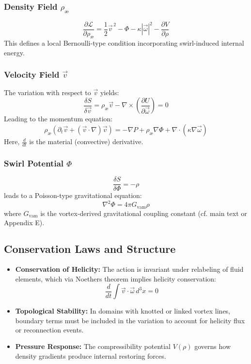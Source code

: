 \subsubsection*{Density Field $\rho_\text{\ae}$}
\begin{equation}
    \frac{\partial \mathcal{L}}{\partial \rho_\text{\ae}} = \frac{1}{2} \vec{v}^{\,2} - \Phi - \kappa |\vec{\omega}|^2 - \frac{\partial V}{\partial \rho}
\end{equation}
This defines a local Bernoulli-type condition incorporating swirl-induced internal energy.

\subsubsection*{Velocity Field $\vec{v}$}
The variation with respect to $\vec{v}$ yields:
\begin{equation}
    \frac{\delta S}{\delta \vec{v}} = \rho_\text{\ae}\vec{v} - \nabla \times \left( \frac{\partial U}{\partial \vec{\omega}} \right) = 0
\end{equation}
Leading to the momentum equation:
\begin{equation}
    \rho_\text{\ae}\left( \partial_t \vec{v} + (\vec{v} \cdot \nabla)\vec{v} \right) = -\nabla P + \rho_\text{\ae}\nabla \Phi + \nabla \cdot \left( \kappa \nabla \vec{\omega} \right)
\end{equation}
Here, $\frac{d}{dt}$ is the material (convective) derivative.

\subsubsection*{Swirl Potential $\Phi$}
\begin{equation}
    \frac{\delta S}{\delta \Phi} = -\rho
\end{equation}
leads to a Poisson-type gravitational equation:
\begin{equation}
    \nabla^2 \Phi = 4\pi G_{\mathrm{vam}} \rho
\end{equation}
where $G_{\mathrm{vam}}$ is the vortex-derived gravitational coupling constant (cf. main text or Appendix E).

\subsection*{Conservation Laws and Structure}
\begin{itemize}
    \item \textbf{Conservation of Helicity:}
    The action is invariant under relabeling of fluid elements, which via Noether\rqs s theorem implies helicity conservation:
    \[
        \frac{d}{dt} \int \vec{v} \cdot \vec{\omega} \, d^3x = 0
    \]
    \item \textbf{Topological Stability:} In domains with knotted or linked vortex lines, boundary terms must be included in the variation to account for helicity flux or reconnection events.
    \item \textbf{Pressure Response:} The compressibility potential $V(\rho)$ governs how density gradients produce internal restoring forces.
\end{itemize}

